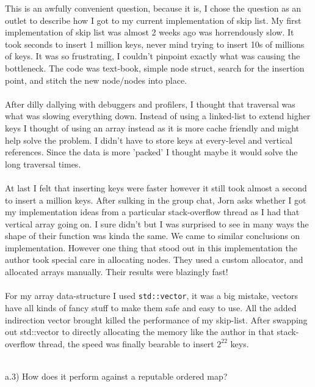 \documentclass[12pt]{article}
\begin{document}
This is an awfully convenient question, because it is, I chose the question as an outlet to describe how I got to my current implementation of skip list. My first implementation of skip list was almost 2 weeks ago was horrendously slow. It took seconds to insert 1 million keys, never mind trying to insert 10s of millions of keys. It was so frustrating, I couldn't pinpoint exactly what was causing the bottleneck. The code was text-book, simple node struct, search for the insertion point, and stitch the new node/nodes into place.
\\\\
After dilly dallying with debuggers and profilers, I thought that traversal was what was slowing everything down. Instead of using a linked-list to extend higher keys I thought of using an array instead as it is more cache friendly and might help solve the problem. I didn't have to store keys at every-level and vertical references. Since the data is more 'packed' I thought maybe it would solve the long traversal times.
\\\\
At last I felt that inserting keys were faster however it still took almost a second to insert a million keys. After sulking in the group chat, Jorn asks whether I got my implementation ideas from a particular stack-overflow thread \cite{stack-overflow} as I had that vertical array going on. I sure didn't but I was surprised to see in many ways the shape of their function was kinda the same. We came to similar conclusions on implementation. However one thing that stood out in this implementation the author took special care in allocating nodes. They used a custom allocator, and allocated arrays manually. Their results were blazingly fast!
\\\\
For my array data-structure I used \texttt{std::vector}, it was a big mistake, vectors have all kinds of fancy stuff to make them safe and easy to use. All the added indirection vector brought killed the performance of my skip-list. After swapping out std::vector to directly allocating the memory  like the author in that stack-overflow thread, the speed was finally bearable to insert $2^{22}$ keys.
\\\\

\pagebreak

a.3) How does it perform against a reputable ordered map?\\
\end{document}
